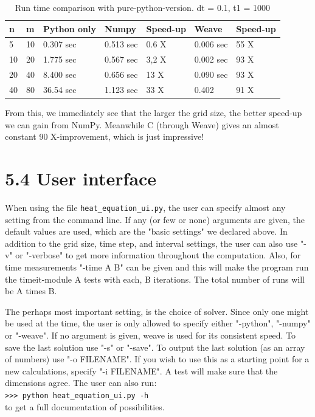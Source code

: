 \documentclass[a4paper]{article}
\begin{document}
\begin{table}[ht]
\centering
\begin{tabular}{|l|l|l|l|l|l|l|}
\hline
\textbf{n} & \textbf{m} & \textbf{Python only} & \textbf{Numpy} & \textbf{Speed-up} & \textbf{Weave} & \textbf{Speed-up} \\ \hline
5 & 10 & 0.307 sec & 0.513 sec & 0.6 X & 0.006 sec & 55 X \\ \hline
10 & 20 & 1.775 sec & 0.567 sec & 3,2 X & 0.002 sec & 93 X \\ \hline
20 & 40 & 8.400 sec & 0.656 sec & 13 X & 0.090 sec & 93 X \\ \hline
40 & 80 & 36.54 sec & 1.123 sec & 33 X & 0.402 & 91 X \\ \hline
\end{tabular}
\caption{Run time comparison with pure-python-version. dt = 0.1, t1 = 1000\label{FIG:test2}}
\end{table}

From this, we immediately see that the larger the grid size, the better speed-up we can gain from NumPy. Meanwhile C (through Weave) gives an almost constant 90 X-improvement, which is just impressive!

\section*{5.4 User interface}
When using the file \texttt{heat\_equation\_ui.py}, the user can specify almost any setting from the command line. If any (or few or none) arguments are given, the default values are used, which are the "basic settings" we declared above. 
In addition to the grid size, time step, and interval settings, the user can also use "-v" or "-verbose" to get more information throughout the computation. Also, for time measurements "-time A B" can be given and this will make the program run the timeit-module A tests with each, B iterations. The total number of runs will be A times B.
\newline

The perhaps most important setting, is the choice of solver. Since only one might be used at the time, the user is only allowed to specify either "-python", "-numpy" or "-weave". If no argument is given, weave is used for its consistent speed. To save the last solution use "-s" or "-save". To output the last solution (as an array of numbers) use "-o FILENAME". If you wish to use this as a starting point for a new calculations, specify "-i FILENAME". A test will make sure that the dimensions agree. The user can also run:\\
\texttt{>>> python heat\_equation\_ui.py -h}\\
to get a full documentation of possibilities.
\end{document}
